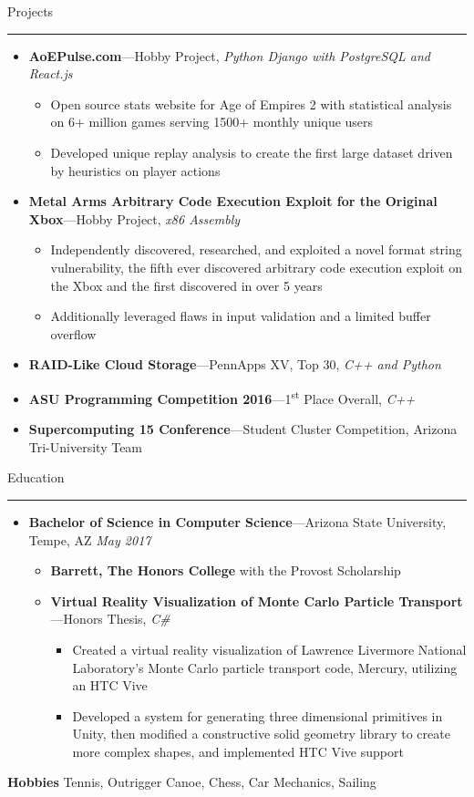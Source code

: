 \documentclass[10pt,oneside]{article}
\newcommand{\hobbies}{Tennis, Outrigger Canoe, Chess, Car Mechanics, Sailing}
\newcommand{\sectitle}[1]{
  \begin{flushleft}{\selectfont\Large#1}\end{flushleft}
}
\newenvironment{ressection}[1]{
  \vspace{0pt}
  \sectitle{#1}
  \vspace{-10pt}\rule{\textwidth}{0.5pt}
  \vspace{-10pt}
  \begin{itemize}[leftmargin=13pt]
  \vspace{-2pt}
}{
  \end{itemize}
}
\newcommand{\ressubitem}[1]{
  \vspace{-1pt}
  \item[--] \begin{flushleft} #1 \end{flushleft}
}
\newcommand{\resmeditem}[2]{
  \vspace{-5pt}
  \item
  \textbf{#1}---#2
}
\newcommand{\resbigitemline}[3]{
  \vspace{-1pt}
  \item
  \textbf{#1}---#2
  \hfill
  \textit{#3}
}
\newcommand{\resbigitemlinenodate}[3]{
  \vspace{-1pt}
  \item
  \textbf{#1}---#2,
  \textit{#3}
}
\newenvironment{ressubsecline}[3]{
  \resbigitemline{#1}{#2}{#3}
  \vspace{-2pt}
  \begin{itemize}
}{
  \end{itemize}
  \vspace{-2pt}
}
\newenvironment{ressubseclinenodate}[3]{
  \resbigitemlinenodate{#1}{#2}{#3}
  \vspace{-2pt}
  \begin{itemize}
}{
  \end{itemize}
}
\begin{document}
\begin{ressection}{Projects}
  \begin{ressubseclinenodate}{AoEPulse.com}{Hobby Project}{Python Django with PostgreSQL and React.js}
    \ressubitem{Open source stats website for Age of Empires 2 with statistical analysis on 6+ million games serving 1500+ monthly unique users}
    \ressubitem{Developed unique replay analysis to create the first large dataset driven by heuristics on player actions}
  \end{ressubseclinenodate}
  \begin{ressubseclinenodate}{Metal Arms Arbitrary Code Execution Exploit for the Original Xbox}{Hobby Project}{x86 Assembly}
    \ressubitem{Independently discovered, researched, and exploited a novel format string vulnerability, the fifth ever discovered arbitrary code execution exploit on the Xbox and the first discovered in over 5 years}
    \ressubitem{Additionally leveraged flaws in input validation and a limited buffer overflow}
  \end{ressubseclinenodate}
  \resbigitemlinenodate{RAID-Like Cloud Storage}{PennApps XV, Top 30}{C++ and Python}
  \resbigitemlinenodate{ASU Programming Competition 2016}{1\textsuperscript{st} Place Overall}{C++}
  \resmeditem{Supercomputing 15 Conference}{Student Cluster Competition,}{Arizona Tri-University Team}
\end{ressection}

\begin{ressection}{Education}
  \begin{ressubsecline}{Bachelor of Science in Computer Science}{Arizona State University, Tempe, AZ}{May 2017}
    \ressubitem{\textbf{Barrett, The Honors College} with the Provost Scholarship}
    \begin{ressubseclinenodate}{Virtual Reality Visualization of Monte Carlo Particle Transport}{Honors Thesis}{C\#}
      \ressubitem{Created a virtual reality visualization of Lawrence Livermore National Laboratory's Monte Carlo particle transport code, Mercury, utilizing an HTC Vive}
      \ressubitem{Developed a system for generating three dimensional primitives in Unity, then modified a constructive solid geometry library to create more complex shapes, and implemented HTC Vive support}
    \end{ressubseclinenodate}
  \end{ressubsecline}
\end{ressection}

\textbf{Hobbies} \hobbies \\
\end{document}
